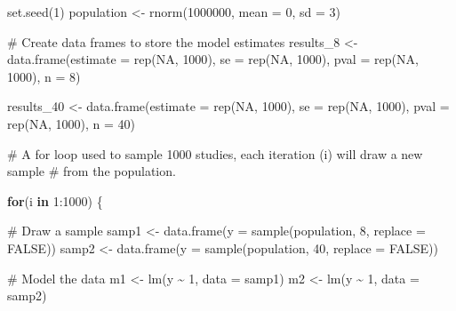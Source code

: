\documentclass[
  letterpaper,
  DIV=11,
  numbers=noendperiod]{scrreprt}
\newenvironment{Shaded}{\begin{snugshade}}{\end{snugshade}}
\newcommand{\AttributeTok}[1]{\textcolor[rgb]{0.40,0.45,0.13}{#1}}
\newcommand{\CommentTok}[1]{\textcolor[rgb]{0.37,0.37,0.37}{#1}}
\newcommand{\ConstantTok}[1]{\textcolor[rgb]{0.56,0.35,0.01}{#1}}
\newcommand{\ControlFlowTok}[1]{\textcolor[rgb]{0.00,0.23,0.31}{\textbf{#1}}}
\newcommand{\DecValTok}[1]{\textcolor[rgb]{0.68,0.00,0.00}{#1}}
\newcommand{\FunctionTok}[1]{\textcolor[rgb]{0.28,0.35,0.67}{#1}}
\newcommand{\NormalTok}[1]{\textcolor[rgb]{0.00,0.23,0.31}{#1}}
\newcommand{\OtherTok}[1]{\textcolor[rgb]{0.00,0.23,0.31}{#1}}
\newcommand{\SpecialCharTok}[1]{\textcolor[rgb]{0.37,0.37,0.37}{#1}}
\begin{document}
\begin{Shaded}
\begin{Highlighting}[]
\FunctionTok{set.seed}\NormalTok{(}\DecValTok{1}\NormalTok{)}
\NormalTok{population }\OtherTok{\textless{}{-}} \FunctionTok{rnorm}\NormalTok{(}\DecValTok{1000000}\NormalTok{, }\AttributeTok{mean =} \DecValTok{0}\NormalTok{, }\AttributeTok{sd =} \DecValTok{3}\NormalTok{)}


\CommentTok{\# Create data frames to store the model estimates}
\NormalTok{results\_8 }\OtherTok{\textless{}{-}} \FunctionTok{data.frame}\NormalTok{(}\AttributeTok{estimate =} \FunctionTok{rep}\NormalTok{(}\ConstantTok{NA}\NormalTok{, }\DecValTok{1000}\NormalTok{), }
                      \AttributeTok{se =} \FunctionTok{rep}\NormalTok{(}\ConstantTok{NA}\NormalTok{, }\DecValTok{1000}\NormalTok{), }
                      \AttributeTok{pval =} \FunctionTok{rep}\NormalTok{(}\ConstantTok{NA}\NormalTok{, }\DecValTok{1000}\NormalTok{), }
                      \AttributeTok{n =} \DecValTok{8}\NormalTok{)  }

\NormalTok{results\_40 }\OtherTok{\textless{}{-}} \FunctionTok{data.frame}\NormalTok{(}\AttributeTok{estimate =} \FunctionTok{rep}\NormalTok{(}\ConstantTok{NA}\NormalTok{, }\DecValTok{1000}\NormalTok{), }
                      \AttributeTok{se =} \FunctionTok{rep}\NormalTok{(}\ConstantTok{NA}\NormalTok{, }\DecValTok{1000}\NormalTok{), }
                      \AttributeTok{pval =} \FunctionTok{rep}\NormalTok{(}\ConstantTok{NA}\NormalTok{, }\DecValTok{1000}\NormalTok{), }
                      \AttributeTok{n =} \DecValTok{40}\NormalTok{)}

\CommentTok{\# A for loop used to sample 1000 studies, each iteration (i) will draw a new sample}
\CommentTok{\# from the population. }

\ControlFlowTok{for}\NormalTok{(i }\ControlFlowTok{in} \DecValTok{1}\SpecialCharTok{:}\DecValTok{1000}\NormalTok{) \{}
  
  \CommentTok{\# Draw a sample }
\NormalTok{  samp1 }\OtherTok{\textless{}{-}} \FunctionTok{data.frame}\NormalTok{(}\AttributeTok{y =} \FunctionTok{sample}\NormalTok{(population, }\DecValTok{8}\NormalTok{, }\AttributeTok{replace =} \ConstantTok{FALSE}\NormalTok{))}
\NormalTok{  samp2 }\OtherTok{\textless{}{-}} \FunctionTok{data.frame}\NormalTok{(}\AttributeTok{y =} \FunctionTok{sample}\NormalTok{(population, }\DecValTok{40}\NormalTok{, }\AttributeTok{replace =} \ConstantTok{FALSE}\NormalTok{))}

  \CommentTok{\# Model the data}
\NormalTok{  m1 }\OtherTok{\textless{}{-}} \FunctionTok{lm}\NormalTok{(y }\SpecialCharTok{\textasciitilde{}} \DecValTok{1}\NormalTok{, }\AttributeTok{data =}\NormalTok{ samp1)}
\NormalTok{  m2 }\OtherTok{\textless{}{-}} \FunctionTok{lm}\NormalTok{(y }\SpecialCharTok{\textasciitilde{}} \DecValTok{1}\NormalTok{, }\AttributeTok{data =}\NormalTok{ samp2)}
  

\end{Highlighting}
\end{Shaded}
\end{document}
